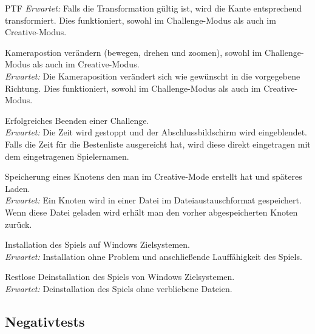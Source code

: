 \begin{ids}{\gls{PTF}}
		\textit{Erwartet:} Falls die Transformation gültig ist, wird die Kante entsprechend transformiert. Dies funktioniert, sowohl im Challenge-Modus als auch im Creative-Modus.

		\id[ 80] Kamerapostion verändern (bewegen, drehen und zoomen), sowohl im Challenge-Modus als auch im Creative-Modus.\\
		
		\textit{Erwartet:} Die Kameraposition verändert sich wie gewünscht in die vorgegebene Richtung. Dies funktioniert, sowohl im Challenge-Modus als auch im Creative-Modus.

		\id[ 90] Erfolgreiches Beenden einer Challenge.\\
		
		\textit{Erwartet:} Die Zeit wird gestoppt und der Abschlussbildschirm wird eingeblendet. Falls die Zeit für die Bestenliste ausgereicht hat, wird diese direkt eingetragen mit dem eingetragenen Spielernamen.

		\id[100] Speicherung eines Knotens den man im Creative-Mode erstellt hat und späteres Laden.\\
		
		\textit{Erwartet:} Ein Knoten wird in einer Datei im Dateiaustauschformat gespeichert. Wenn diese Datei geladen wird erhält man den vorher abgespeicherten Knoten zurück.
		
		\id[120] Installation des Spiels auf Windows Zielsystemen.\\
		
		\textit{Erwartet:} Installation ohne Problem und anschließende Lauffähigkeit des Spiels.

		\id[130] Restlose Deinstallation des Spiels von Windows Zielsystemen.\\
		
		\textit{Erwartet:} Deinstallation des Spiels ohne verbliebene Dateien.
		
	

	\end{ids}


\clearpage


%
%
\subsection{Negativtests}

